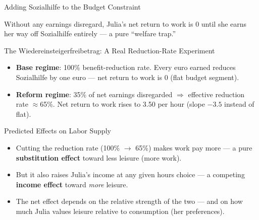\documentclass[11pt,aspectratio=169]{beamer}
\begin{document}
\begin{frame}{Adding Sozialhilfe to the Budget Constraint}
  \begin{center}
  \end{center}
  \centering \small
  Without any earnings disregard, Julia's net return to work is \texteuro{}0 until she earns her way off Sozialhilfe entirely --- a pure ``welfare trap.''
\end{frame}

\begin{frame}{The Wiedereinsteigerfreibetrag: A Real Reduction-Rate Experiment}
  \begin{itemize}
    \item \textbf{Base regime}: 100\% benefit-reduction rate. Every euro earned reduces Sozialhilfe by one euro --- net return to work is \texteuro{}0 (flat budget segment).
    \item \textbf{Reform regime}: 35\% of net earnings disregarded $\Rightarrow$ effective reduction rate \(\approx\)65\%. Net return to work rises to \texteuro{}3.50 per hour (slope $-3.5$ instead of flat).
  \end{itemize}
\end{frame}

\begin{frame}{Predicted Effects on Labor Supply}
  \begin{itemize}
    \item Cutting the reduction rate (100\% $\to$ 65\%) makes work pay more --- a pure \textbf{substitution effect} toward less leisure (more work).
    \item But it also raises Julia's income at any given hours choice --- a competing \textbf{income effect} toward \emph{more} leisure.
    \item The net effect depends on the relative strength of the two --- and on how much Julia values leisure relative to consumption (her preferences).
  \end{itemize}

\end{frame}
\end{document}
